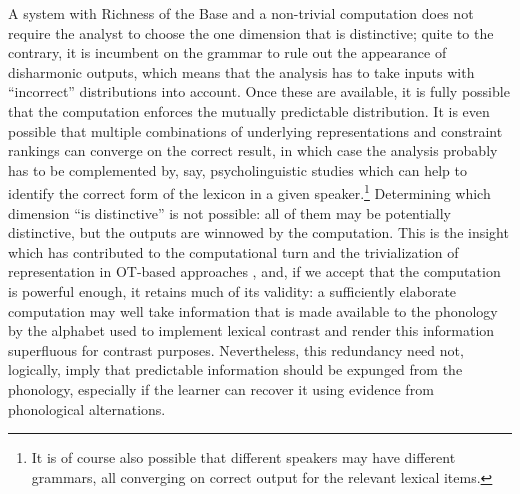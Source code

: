 A system with Richness of the Base and a non\hyp trivial computation does not require the analyst to choose the one dimension that is distinctive; quite to the contrary, it is incumbent on the grammar to rule out the appearance of disharmonic outputs, which means that the analysis has to take inputs with \enquote{incorrect} distributions into account. Once these are available, it is fully possible that the computation enforces the mutually predictable distribution. It is even possible that multiple combinations of underlying representations and constraint rankings can converge on the correct result, in which case the analysis probably has to be complemented by, say, psycholinguistic studies which can help to identify the correct form of the lexicon in a given speaker.\footnote{It is of course also possible that different speakers may have different grammars, all converging on correct output for the relevant lexical items.} Determining which dimension \enquote{is distinctive} is not possible: all of them may be potentially distinctive, but the outputs are winnowed by the computation. This is the insight which has contributed to the computational turn and the trivialization of representation in OT\hyp based approaches \citep{kirchner97:_contr,flemming05:_deriv}, and, if we accept that the computation is powerful enough, it retains much of its validity: a sufficiently elaborate computation may well take information that is made available to the phonology by the alphabet used to implement lexical contrast and render this information superfluous for contrast purposes. Nevertheless, this redundancy need not, logically, imply that predictable information should be expunged from the phonology, especially if the learner can recover it using evidence from phonological alternations.

